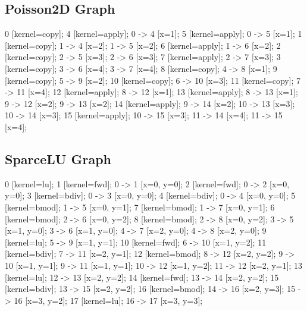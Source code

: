 \documentclass[11pt, oneside]{article}   	%
\begin{document}
\subsection{Poisson2D Graph}
\vspace{20pt}

 {
	0	 [kernel=copy];
	4	 [kernel=apply];
	0 -> 4	 [x=1];
	5	 [kernel=apply];
	0 -> 5	 [x=1];
	1	 [kernel=copy];
	1 -> 4	 [x=2];
	1 -> 5	 [x=2];
	6	 [kernel=apply];
	1 -> 6	 [x=2];
	2	 [kernel=copy];
	2 -> 5	 [x=3];
	2 -> 6	 [x=3];
	7	 [kernel=apply];
	2 -> 7	 [x=3];
	3	 [kernel=copy];
	3 -> 6	 [x=4];
	3 -> 7	 [x=4];
	8	 [kernel=copy];
	4 -> 8	 [x=1];
	9	 [kernel=copy];
	5 -> 9	 [x=2];
	10	 [kernel=copy];
	6 -> 10	 [x=3];
	11	 [kernel=copy];
	7 -> 11	 [x=4];
	12	 [kernel=apply];
	8 -> 12	 [x=1];
	13	 [kernel=apply];
	8 -> 13	 [x=1];
	9 -> 12	 [x=2];
	9 -> 13	 [x=2];
	14	 [kernel=apply];
	9 -> 14	 [x=2];
	10 -> 13	 [x=3];
	10 -> 14	 [x=3];
	15	 [kernel=apply];
	10 -> 15	 [x=3];
	11 -> 14	 [x=4];
	11 -> 15	 [x=4];
}

\subsection{SparceLU Graph}
\vspace{20pt}

 {
	0	 [kernel=lu];
	1	 [kernel=fwd];
	0 -> 1	 [x=0,
		y=0];
	2	 [kernel=fwd];
	0 -> 2	 [x=0,
		y=0];
	3	 [kernel=bdiv];
	0 -> 3	 [x=0,
		y=0];
	4	 [kernel=bdiv];
	0 -> 4	 [x=0,
		y=0];
	5	 [kernel=bmod];
	1 -> 5	 [x=0,
		y=1];
	7	 [kernel=bmod];
	1 -> 7	 [x=0,
		y=1];
	6	 [kernel=bmod];
	2 -> 6	 [x=0,
		y=2];
	8	 [kernel=bmod];
	2 -> 8	 [x=0,
		y=2];
	3 -> 5	 [x=1,
		y=0];
	3 -> 6	 [x=1,
		y=0];
	4 -> 7	 [x=2,
		y=0];
	4 -> 8	 [x=2,
		y=0];
	9	 [kernel=lu];
	5 -> 9	 [x=1,
		y=1];
	10	 [kernel=fwd];
	6 -> 10	 [x=1,
		y=2];
	11	 [kernel=bdiv];
	7 -> 11	 [x=2,
		y=1];
	12	 [kernel=bmod];
	8 -> 12	 [x=2,
		y=2];
	9 -> 10	 [x=1,
		y=1];
	9 -> 11	 [x=1,
		y=1];
	10 -> 12	 [x=1,
		y=2];
	11 -> 12	 [x=2,
		y=1];
	13	 [kernel=lu];
	12 -> 13	 [x=2,
		y=2];
	14	 [kernel=fwd];
	13 -> 14	 [x=2,
		y=2];
	15	 [kernel=bdiv];
	13 -> 15	 [x=2,
		y=2];
	16	 [kernel=bmod];
	14 -> 16	 [x=2,
		y=3];
	15 -> 16	 [x=3,
		y=2];
	17	 [kernel=lu];
	16 -> 17	 [x=3,
		y=3];
}
\end{document}
